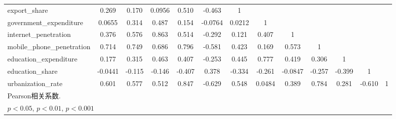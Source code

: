 \begin{table}[htbp]
\begin{tabular}{l*{12}{c}}
export\_share&    0.269\sym{***}&    0.170\sym{***}&   0.0956         &    0.510\sym{***}&   -0.463\sym{***}&        1         &                  &                  &                  &                  &                  &                  \\
government\_expenditure&   0.0655         &    0.314\sym{***}&    0.487\sym{***}&    0.154\sym{**} &  -0.0764         &   0.0212         &        1         &                  &                  &                  &                  &                  \\
internet\_penetration&    0.376\sym{***}&    0.576\sym{***}&    0.863\sym{***}&    0.514\sym{***}&   -0.292\sym{***}&    0.121\sym{*}  &    0.407\sym{***}&        1         &                  &                  &                  &                  \\
mobile\_phone\_penetration&    0.714\sym{***}&    0.749\sym{***}&    0.686\sym{***}&    0.796\sym{***}&   -0.581\sym{***}&    0.423\sym{***}&    0.169\sym{***}&    0.573\sym{***}&        1         &                  &                  &                  \\
education\_expenditure&    0.177\sym{***}&    0.315\sym{***}&    0.463\sym{***}&    0.407\sym{***}&   -0.253\sym{***}&    0.445\sym{***}&    0.777\sym{***}&    0.419\sym{***}&    0.306\sym{***}&        1         &                  &                  \\
education\_share&  -0.0441         &   -0.115\sym{*}  &   -0.146\sym{**} &   -0.407\sym{***}&    0.378\sym{***}&   -0.334\sym{***}&   -0.261\sym{***}&  -0.0847         &   -0.257\sym{***}&   -0.399\sym{***}&        1         &                  \\
urbanization\_rate&    0.601\sym{***}&    0.577\sym{***}&    0.512\sym{***}&    0.847\sym{***}&   -0.629\sym{***}&    0.548\sym{***}&   0.0484         &    0.389\sym{***}&    0.784\sym{***}&    0.281\sym{***}&   -0.610\sym{***}&        1         \\
\hline\hline
\multicolumn{13}{l}{\footnotesize Pearson相关系数.}\\
\multicolumn{13}{l}{\footnotesize \sym{*} \(p<0.05\), \sym{**} \(p<0.01\), \sym{***} \(p<0.001\)}\\
\end{tabular}
\end{table}
